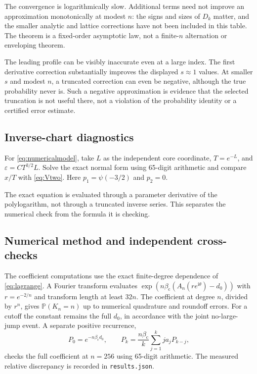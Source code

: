 \documentclass[11pt,a4paper]{article}
\numberwithin{equation}{section}
\theoremstyle{definition}\newtheorem{definition}[theorem]{Definition}
\theoremstyle{remark}\newtheorem{remark}[theorem]{Remark}
\theoremstyle{definition}
\newcommand{\Prob}{\mathbb P}\newcommand{\ii}{\mathrm i}
\newcommand{\bc}{\beta_{\mathrm c}}\newcommand{\rhoc}{\rho_{\mathrm c}}
\begin{document}


The convergence is logarithmically slow. Additional terms need not improve
an approximation monotonically at modest $n$: the signs and sizes of
$D_k$ matter, and the smaller analytic and lattice corrections have not
been included in this table. The theorem is a fixed-order asymptotic law,
not a finite-$n$ alternation or enveloping theorem.



The leading profile can be visibly inaccurate even at a large index.
The first derivative correction substantially improves the displayed
$s\approx1$ values. At smaller $s$ and modest $n$, a truncated correction
can even be negative, although the true probability never is. Such a
negative approximation is evidence that the selected truncation is not
useful there, not a violation of the probability identity or a certified
error estimate.

\subsection{Inverse-chart diagnostics}
For \eqref{eq:numericalmodel}, take $L$ as the independent core coordinate,
$T=e^{-L}$, and $\varepsilon=C T^{3/2}L$. Solve the exact normal form using
65-digit arithmetic and compare $x/T$ with \eqref{eq:Vtwo}. Here
$p_1=\psi(-3/2)$ and $p_2=0$.


The exact equation is evaluated through a parameter derivative of the
polylogarithm, not through a truncated inverse series. This separates the
numerical check from the formula it is checking.

\subsection{Numerical method and independent cross-checks}
The coefficient computations use the exact finite-degree dependence of
\eqref{eq:lagrange}. A Fourier transform evaluates
$\exp(n\bc(A_n(re^{\ii\theta})-d_0))$ with $r=e^{-2/n}$ and transform
length at least $32n$. The coefficient at degree $n$, divided by $r^n$,
gives $\Prob(K_n=n)$ up to numerical quadrature and roundoff errors.
For a cutoff the constant remains the full $d_0$, in accordance with the
joint no-large-jump event. A separate positive recurrence,
\[
 P_0=e^{-n\bc d_0},\qquad
 P_k=\frac{n\bc}{k}\sum_{j=1}^k j a_j P_{k-j},
\]
checks the full coefficient at $n=256$ using 65-digit arithmetic.
The measured relative discrepancy is recorded in \texttt{results.json}.
\end{document}

